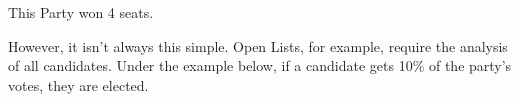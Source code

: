 \documentclass{article}
\begin{document}
    This Party won 4 seats. 

    

    However, it isn't always this simple. Open Lists, for example, require the analysis of all candidates. Under the example below, if a candidate gets 10\% of the party's votes, they are elected. 

    
\end{document}
